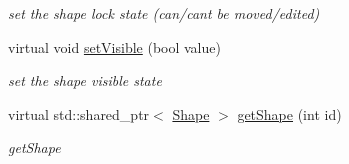 \begin{DoxyCompactItemize}
\begin{DoxyCompactList}\small\item\em set the shape lock state (can/can\textquotesingle{}t be moved/edited) \end{DoxyCompactList}\item 
virtual void \hyperlink{classcanvascv_1_1CompoundShape_a85f3aa483aa21bae7dc60de118a60580}{set\+Visible} (bool value)\hypertarget{classcanvascv_1_1CompoundShape_a85f3aa483aa21bae7dc60de118a60580}{}\label{classcanvascv_1_1CompoundShape_a85f3aa483aa21bae7dc60de118a60580}

\begin{DoxyCompactList}\small\item\em set the shape visible state \end{DoxyCompactList}\item 
virtual std\+::shared\+\_\+ptr$<$ \hyperlink{classcanvascv_1_1Shape}{Shape} $>$ \hyperlink{classcanvascv_1_1CompoundShape_aa9ef6ed91e5a2b6fbd3efe13fbd8e561}{get\+Shape} (int id)
\begin{DoxyCompactList}\small\item\em get\+Shape \end{DoxyCompactList}\end{DoxyCompactItemize}
